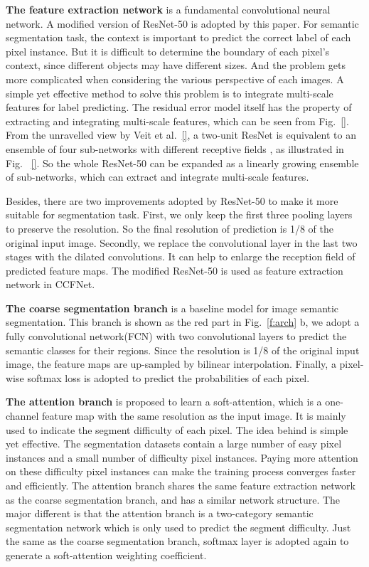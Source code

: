 \documentclass[10.5pt,compsoc]{TsT}
\theoremstyle{mystyle}
\begin{document}
{\textbf{The feature extraction network} is a fundamental convolutional neural network.
A modified version of ResNet-50 is adopted by this paper.
For semantic segmentation task,  the context is important to predict the correct label of each pixel instance.
But it is difficult to determine the boundary of each pixel's context, since different objects may have different sizes.
And the problem gets more complicated when considering the various perspective of each images.
A simple yet effective method to solve this problem is to integrate multi-scale features for label predicting.
The residual error model itself has the property of extracting and integrating multi-scale features, which can be seen from Fig.~\ref{}.
From the unravelled view by Veit et al.~\ref{}, a two-unit ResNet is equivalent to an ensemble of four sub-networks with different receptive fields , as illustrated in Fig. ~\ref{}.
So the whole ResNet-50 can be expanded as a linearly growing ensemble of sub-networks, which can extract and integrate multi-scale features.

Besides, there are two improvements adopted by ResNet-50 to make it more suitable for segmentation task.
First, we only keep the first three pooling layers to preserve the resolution.
So the final resolution of prediction is 1/8 of the original input image. 
Secondly, we replace the convolutional layer in the last two stages with the dilated convolutions.
It can help to enlarge the reception field of predicted feature maps.
The modified ResNet-50 is used as feature extraction network in CCFNet.

\textbf{The coarse segmentation branch} is a baseline model for image semantic segmentation.
This branch is shown as the red part in Fig.~\ref{f:arch} b, we adopt a fully convolutional network(FCN) with two convolutional layers to predict the semantic classes for their regions.
Since the resolution is 1/8 of the original input image, the feature maps are up-sampled by bilinear interpolation.
Finally, a pixel-wise softmax loss is adopted to predict the probabilities of each pixel.


\textbf{The attention branch} is proposed to learn a soft-attention, which is a one-channel feature map with the same resolution as the input image. 
It is mainly used to indicate the segment difficulty of each pixel.
The idea behind is simple yet effective. 
The segmentation datasets contain a large number of easy pixel instances and a small number of difficulty pixel instances.
Paying more attention on these difficulty pixel instances can make the training process converges faster and efficiently.
The attention branch shares the same feature extraction network as the coarse segmentation branch, and has a similar network structure.
The major different is that the attention branch is a two-category semantic segmentation network which is only used to predict the segment difficulty.
Just the same as the coarse segmentation branch, softmax layer is adopted again to generate a soft-attention weighting coefficient.


}
\end{document}
